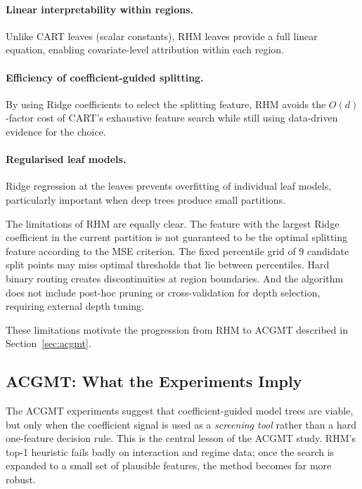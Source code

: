 \documentclass[11pt,a4paper]{article}
\begin{document}
\paragraph{Linear interpretability within regions.} Unlike CART leaves (scalar constants), RHM leaves provide a full linear equation, enabling covariate-level attribution within each region.

\paragraph{Efficiency of coefficient-guided splitting.} By using Ridge coefficients to select the splitting feature, RHM avoids the $O(d)$-factor cost of CART's exhaustive feature search while still using data-driven evidence for the choice.

\paragraph{Regularised leaf models.} Ridge regression at the leaves prevents overfitting of individual leaf models, particularly important when deep trees produce small partitions.

The limitations of RHM are equally clear. The feature with the largest Ridge coefficient in the current partition is not guaranteed to be the optimal splitting feature according to the MSE criterion. The fixed percentile grid of 9 candidate split points may miss optimal thresholds that lie between percentiles. Hard binary routing creates discontinuities at region boundaries. And the algorithm does not include post-hoc pruning or cross-validation for depth selection, requiring external depth tuning.

These limitations motivate the progression from RHM to ACGMT described in Section~\ref{sec:acgmt}.

\subsection{ACGMT: What the Experiments Imply}

The ACGMT experiments suggest that coefficient-guided model trees are viable, but only when the coefficient signal is used as a \emph{screening tool} rather than a hard one-feature decision rule. This is the central lesson of the ACGMT study. RHM's top-1 heuristic fails badly on interaction and regime data; once the search is expanded to a small set of plausible features, the method becomes far more robust.
\end{document}
